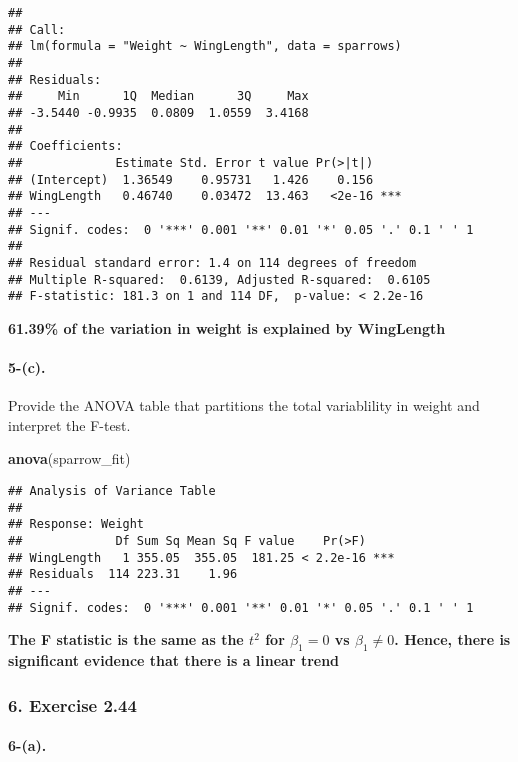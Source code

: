 \documentclass[]{article}
\newenvironment{Shaded}{\begin{snugshade}}{\end{snugshade}}
\newcommand{\KeywordTok}[1]{\textcolor[rgb]{0.13,0.29,0.53}{\textbf{{#1}}}}
\newcommand{\NormalTok}[1]{{#1}}
\let\oldparagraph\paragraph
\renewcommand{\paragraph}[1]{\oldparagraph{#1}\mbox{}}
\begin{document}
\begin{verbatim}
## 
## Call:
## lm(formula = "Weight ~ WingLength", data = sparrows)
## 
## Residuals:
##     Min      1Q  Median      3Q     Max 
## -3.5440 -0.9935  0.0809  1.0559  3.4168 
## 
## Coefficients:
##             Estimate Std. Error t value Pr(>|t|)    
## (Intercept)  1.36549    0.95731   1.426    0.156    
## WingLength   0.46740    0.03472  13.463   <2e-16 ***
## ---
## Signif. codes:  0 '***' 0.001 '**' 0.01 '*' 0.05 '.' 0.1 ' ' 1
## 
## Residual standard error: 1.4 on 114 degrees of freedom
## Multiple R-squared:  0.6139, Adjusted R-squared:  0.6105 
## F-statistic: 181.3 on 1 and 114 DF,  p-value: < 2.2e-16
\end{verbatim}

\textbf{61.39\% of the variation in weight is explained by WingLength}

\paragraph{5-(c).}\label{c.-1}

Provide the ANOVA table that partitions the total variablility in weight
and interpret the F-test.

\begin{Shaded}
\begin{Highlighting}[]
\KeywordTok{anova}\NormalTok{(sparrow_fit)}
\end{Highlighting}
\end{Shaded}

\begin{verbatim}
## Analysis of Variance Table
## 
## Response: Weight
##             Df Sum Sq Mean Sq F value    Pr(>F)    
## WingLength   1 355.05  355.05  181.25 < 2.2e-16 ***
## Residuals  114 223.31    1.96                      
## ---
## Signif. codes:  0 '***' 0.001 '**' 0.01 '*' 0.05 '.' 0.1 ' ' 1
\end{verbatim}

\textbf{The F statistic is the same as the \(t^2\) for \(\beta_{1}=0\)
vs \(\beta_{1} \neq 0\). Hence, there is significant evidence that there
is a linear trend}

\subsubsection{6. Exercise 2.44}\label{exercise-2.44}

\paragraph{6-(a).}\label{a.-2}
\end{document}
